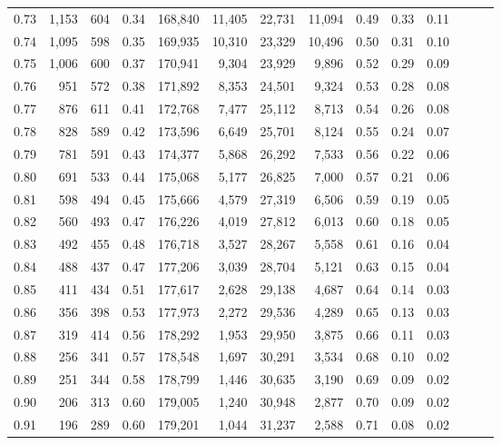 \begin{tabular}{rrrrrrrrrrrrrr}
0.73 &  1,153 &  604 &  0.34 &  168,840 &   11,405 &  22,731 &  11,094 &  0.49 &  0.33 &      0.11 \\
0.74 &  1,095 &  598 &  0.35 &  169,935 &   10,310 &  23,329 &  10,496 &  0.50 &  0.31 &      0.10 \\
0.75 &  1,006 &  600 &  0.37 &  170,941 &    9,304 &  23,929 &   9,896 &  0.52 &  0.29 &      0.09 \\
0.76 &    951 &  572 &  0.38 &  171,892 &    8,353 &  24,501 &   9,324 &  0.53 &  0.28 &      0.08 \\
0.77 &    876 &  611 &  0.41 &  172,768 &    7,477 &  25,112 &   8,713 &  0.54 &  0.26 &      0.08 \\
0.78 &    828 &  589 &  0.42 &  173,596 &    6,649 &  25,701 &   8,124 &  0.55 &  0.24 &      0.07 \\
0.79 &    781 &  591 &  0.43 &  174,377 &    5,868 &  26,292 &   7,533 &  0.56 &  0.22 &      0.06 \\
0.80 &    691 &  533 &  0.44 &  175,068 &    5,177 &  26,825 &   7,000 &  0.57 &  0.21 &      0.06 \\
0.81 &    598 &  494 &  0.45 &  175,666 &    4,579 &  27,319 &   6,506 &  0.59 &  0.19 &      0.05 \\
0.82 &    560 &  493 &  0.47 &  176,226 &    4,019 &  27,812 &   6,013 &  0.60 &  0.18 &      0.05 \\
0.83 &    492 &  455 &  0.48 &  176,718 &    3,527 &  28,267 &   5,558 &  0.61 &  0.16 &      0.04 \\
0.84 &    488 &  437 &  0.47 &  177,206 &    3,039 &  28,704 &   5,121 &  0.63 &  0.15 &      0.04 \\
0.85 &    411 &  434 &  0.51 &  177,617 &    2,628 &  29,138 &   4,687 &  0.64 &  0.14 &      0.03 \\
0.86 &    356 &  398 &  0.53 &  177,973 &    2,272 &  29,536 &   4,289 &  0.65 &  0.13 &      0.03 \\
0.87 &    319 &  414 &  0.56 &  178,292 &    1,953 &  29,950 &   3,875 &  0.66 &  0.11 &      0.03 \\
0.88 &    256 &  341 &  0.57 &  178,548 &    1,697 &  30,291 &   3,534 &  0.68 &  0.10 &      0.02 \\
0.89 &    251 &  344 &  0.58 &  178,799 &    1,446 &  30,635 &   3,190 &  0.69 &  0.09 &      0.02 \\
0.90 &    206 &  313 &  0.60 &  179,005 &    1,240 &  30,948 &   2,877 &  0.70 &  0.09 &      0.02 \\
0.91 &    196 &  289 &  0.60 &  179,201 &    1,044 &  31,237 &   2,588 &  0.71 &  0.08 &      0.02 \\

\end{tabular}
